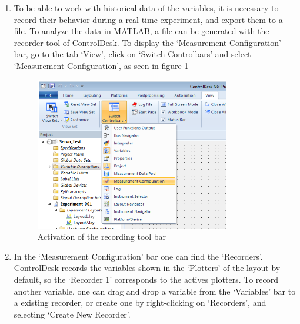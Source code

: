 \begin{enumerate}
    \item To be able to work with historical data of the variables, it is necessary to record their behavior during a real time experiment, and export them to a file. To analyze the data in MATLAB, a file can be generated with the recorder tool of ControlDesk. To display the ‘Measurement Configuration’ bar, go to the tab ‘View’, click on ‘Switch Controlbars’ and select ‘Measurement Configuration’, as seen in figure \ref{fig30}
    \begin{figure}[H]
        \centering
        \includegraphics[width=0.8\textwidth]{Images/Ball and Bean/ControlDesk/CD7.png}
        \caption{Activation of the recording tool bar}
        \label{fig30}
    \end{figure}
    \item In the ‘Measurement Configuration’ bar one can find the ‘Recorders’. ControlDesk records the variables shown in the ‘Plotters’ of the layout by default, so the ‘Recorder 1’ corresponds to the actives plotters. To record another variable, one can drag and drop a variable from the ‘Variables’ bar to a existing recorder, or create one by right-clicking on ‘Recorders’, and selecting ‘Create New Recorder’.


\end{enumerate}
